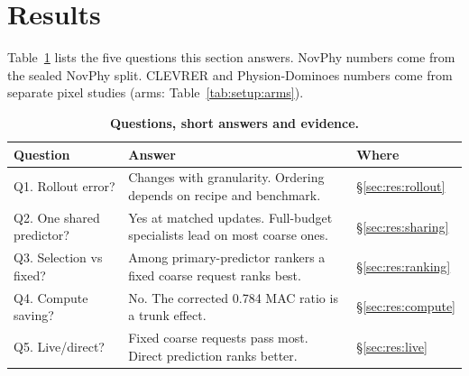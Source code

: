 \section{Results}
\label{sec:res}

\begin{revblock}
\nopagebreak
Table~\ref{tab:res:qa} lists the five questions this section answers. NovPhy numbers come from the sealed NovPhy split. CLEVRER and Physion-Dominoes numbers come from separate pixel studies (arms: Table~\ref{tab:setup:arms}).
\end{revblock}

\begin{table}[!htb]
\begin{revblock}
\centering
\footnotesize
\setlength{\tabcolsep}{3pt}
\caption{\textbf{Questions, short answers and evidence.}}
\label{tab:res:qa}
\begin{tabular}{@{}lll@{}}
\toprule
Question & Answer & Where \\
\midrule
Q1. Rollout error? & Changes with granularity. Ordering depends on recipe and benchmark. & \S\ref{sec:res:rollout} \\
Q2. One shared predictor? & Yes at matched updates. Full-budget specialists lead on most coarse ones. & \S\ref{sec:res:sharing} \\
Q3. Selection vs fixed? & Among primary-predictor rankers a fixed coarse request ranks best. & \S\ref{sec:res:ranking} \\
Q4. Compute saving? & No. The corrected 0.784 MAC ratio is a trunk effect. & \S\ref{sec:res:compute} \\
Q5. Live/direct? & Fixed coarse requests pass most. Direct prediction ranks better. & \S\ref{sec:res:live} \\
\bottomrule
\end{tabular}
\end{revblock}
\end{table}

